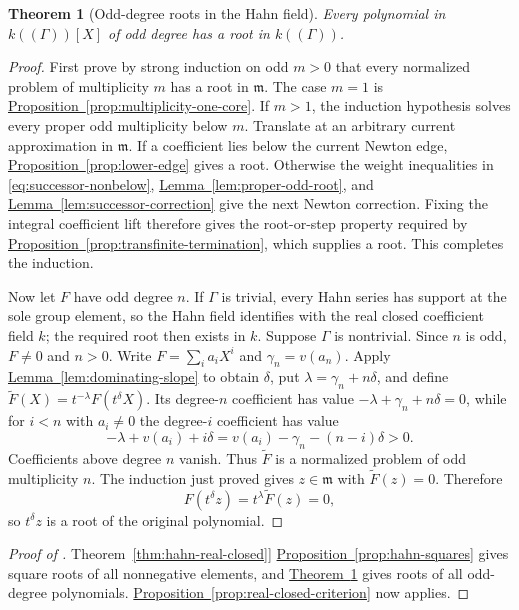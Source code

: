 \documentclass[11pt]{article}
\newcommand{\Val}{v}
\newcommand{\namedref}[2]{\hyperref[#2]{#1~\ref*{#2}}}
\theoremstyle{proofnote}
\newtheorem{theorem}{Theorem}[section]
\begin{document}
\begin{theorem}[Odd-degree roots in the Hahn field]
\label{thm:hahn-odd-roots}
  Every polynomial in \(k((\Gamma))[X]\) of odd degree has a root in
  \(k((\Gamma))\).
\end{theorem}
\begin{proof}
  First prove by strong induction on odd \(m>0\) that every normalized problem
  of multiplicity \(m\) has a root in \(\mathfrak m\).  The case \(m=1\) is
  \namedref{Proposition}{prop:multiplicity-one-core}.  If \(m>1\), the
  induction hypothesis solves every proper odd multiplicity below \(m\).
  Translate at an arbitrary current approximation in \(\mathfrak m\).  If a
  coefficient lies below the current Newton edge,
  \namedref{Proposition}{prop:lower-edge} gives a root.  Otherwise the weight
  inequalities in \eqref{eq:successor-nonbelow},
  \namedref{Lemma}{lem:proper-odd-root}, and
  \namedref{Lemma}{lem:successor-correction} give the next Newton correction.
  Fixing the integral coefficient lift therefore gives the root-or-step
  property required by
  \namedref{Proposition}{prop:transfinite-termination}, which supplies a root.
  This completes the induction.

  Now let \(F\) have odd degree \(n\).  If \(\Gamma\) is trivial, every Hahn
  series has support at the sole group element, so the Hahn field identifies
  with the real closed coefficient field \(k\); the required root then exists
  in \(k\).  Suppose \(\Gamma\) is nontrivial.  Since \(n\) is odd,
  \(F\ne0\) and \(n>0\).  Write \(F=\sum_i a_iX^i\) and
  \(\gamma_n=\Val(a_n)\).  Apply
  \namedref{Lemma}{lem:dominating-slope} to obtain \(\delta\), put
  \(\lambda=\gamma_n+n\delta\), and define
  \(\widetilde F(X)=t^{-\lambda}F(t^\delta X)\).  Its degree-\(n\)
  coefficient has value \(-\lambda+\gamma_n+n\delta=0\), while for
  \(i<n\) with \(a_i\ne0\) the degree-\(i\) coefficient has value
  \[
    -\lambda+\Val(a_i)+i\delta
      =\Val(a_i)-\gamma_n-(n-i)\delta>0.
  \]
  Coefficients above degree \(n\) vanish.  Thus \(\widetilde F\) is a
  normalized problem of odd multiplicity \(n\).
  The induction just proved gives \(z\in\mathfrak m\) with
  \(\widetilde F(z)=0\).  Therefore
  \[
    F(t^\delta z)=t^\lambda\widetilde F(z)=0,
  \]
  so \(t^\delta z\) is a root of the original polynomial.
\end{proof}

\begin{proof}[Proof of \namedref{Theorem}{thm:hahn-real-closed}]
  \namedref{Proposition}{prop:hahn-squares} gives square roots of all nonnegative
  elements, and \namedref{Theorem}{thm:hahn-odd-roots} gives roots of all
  odd-degree polynomials.  \namedref{Proposition}{prop:real-closed-criterion}
  now applies.
\end{proof}
\end{document}
